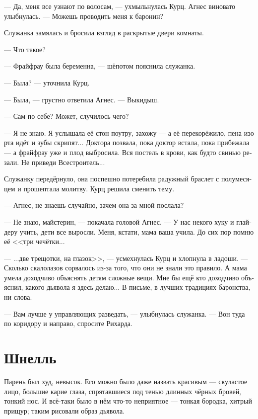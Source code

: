 \documentclass[a4paper,10pt,fleqn]{book}\usepackage{polyglossia}\setdefaultlanguage[babelshorthands=true]{russian}\setotherlanguage{english}\defaultfontfeatures{Ligatures=TeX,Mapping=tex-text}\usepackage{xcolor}\newcommand{\ml}[3]{#2}
\begin{document}
--- Да, меня все узнают по волосам, --- ухмыльнулась Курц.
Агнес виновато улыбнулась.
--- Можешь проводить меня к баронин?

Служанка замялась и бросила взгляд в раскрытые двери комнаты.

--- Что такое?

\ml{$0$}
{--- Фрайфрау была беременна, --- шёпотом пояснила служанка.}
{``Freifrau was pregnant,'' the servant quietly explained.}

\ml{$0$}
{--- Была? --- уточнила Курц.}
{``Was?'' Kurz asked.}

--- Была, --- грустно ответила Агнес.
\ml{$0$}
{--- Выкидыш.}
{``She lost the baby.''}

--- Сам по себе?
\ml{$0$}
{Может, случилось чего?}
{Maybe, something's happened?''}

--- Я не знаю.
Я услышала её стон поутру, захожу --- а её перекорёжило, пена изо рта идёт и зубы скрипят...
Доктора позвала, пока доктор встала, пока прибежала --- а фрайфрау уже и плод выбросила.
Вся постель в крови, как будто свинью резали.
Не приведи Всестроитель...

Служанку передёрнуло, она поспешно потеребила радужный браслет с полумесяцем и прошептала молитву.
Курц решила сменить тему.

--- Агнес, не знаешь случайно, зачем она за мной послала?

--- Не знаю, майстерин, --- покачала головой Агнес.
--- У нас некого хуку и глайдеру учить, дети все выросли.
Меня, кстати, мама ваша учила.
До сих пор помню её <<три чечётки...

--- ...две трещотки, на глазок>>, --- усмехнулась Курц и хлопнула в ладоши.
--- Сколько скалолазов сорвалось из-за того, что они не знали это правило.
А мама умела доходчиво объяснять детям сложные вещи.
Мне бы ещё кто доходчиво объяснил, какого дьявола я здесь делаю...
В письме, в лучших традициях баронства, ни слова.

--- Вам лучше у управляющих разведать, --- улыбнулась служанка.
--- Вон туда по коридору и направо, спросите Рихарда.

\section{Шнелль}

Парень был худ, невысок.
Его можно было даже назвать красивым --- скуластое лицо, большие карие глаза, спрятавшиеся под тенью длинных чёрных бровей, тонкий нос.
И всё-таки было в нём что-то неприятное --- тонкая бородка, хитрый прищур;
таким рисовали образ дьявола.
\end{document}
